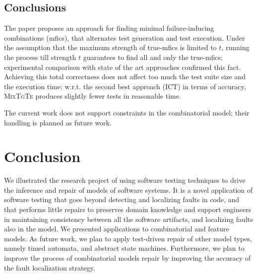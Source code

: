 \documentclass[
12pt, %
oneside, %
english, %
singlespacing, %
headsepline, %
consistentlayout, %
]{MastersDoctoralThesis} %
\newcommand{\red}[1]{\textcolor{red}{#1}}
\newcommand{\mix}{\textsc{MixTgTe}\xspace}
\newcommand{\truemfics}{true-\textsf{mfics}\xspace}
\newcommand{\mfics}{\textsf{mfics}\xspace}
\theoremstyle{plain}
\theoremstyle{definition}
\theoremstyle{remark}
\theoremstyle{plain}
\theoremstyle{plain}
\theoremstyle{remark}
\begin{document}


\section{Conclusions}\label{sec:conclusions}
The paper proposes an approach for finding minimal failure-inducing combinations (\mfics), that alternates test generation and test execution. Under the assumption that the maximum strength of \truemfics is limited to $t$, running the process till strength $t$ guarantees to find all and only the \truemfics; experimental comparison with state of the art approaches confirmed this fact. Achieving this total correctness does not affect too much the test suite size and the execution time: w.r.t. the second best approach (ICT) in terms of accuracy, \mix produces slightly fewer tests in reasonable time.

The current work does not support constraints in the combinatorial model; their handling is planned as future work.


\chapter{Conclusion}
We illustrated the research project of using software testing techniques to drive the inference and repair of models of software systems.
It is a novel application of software testing that goes beyond detecting and localizing faults in code, and that performs little repairs to preserves domain knowledge and support engineers in maintaining consistency between all the software artifacts, and localizing faults also in the model. 
We presented applications to combinatorial and feature models. As future work, we plan to apply test-driven repair of other model types, namely timed automata, and abstract state machines. Furthermore, we plan to improve the process of combinatorial models repair by improving the accuracy of the fault localization strategy.%


 
\end{document}
